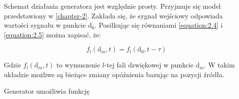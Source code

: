 Schemat działania generatora jest względnie prosty. Przyjmuje się model przedstawiony w \ref{chapter-2}. Zakłada się, że sygnał wejściowy odpowiada wartości sygnału w punkcie $\bm{\mathrm{d}}_{0}$. Posiłkując się równaniami \ref{equation:2.4} i \ref{equation:2.5} można zapisać, że:

\begin{equation}
    \label{delay model}
    f_{l}(\bm{\mathrm{d}}_{m},t) = 
    f_{l}(\bm{\mathrm{d}}_{0},t-\tau)
\end{equation}

\noindent Gdzie $f_{l}(\bm{\mathrm{d}}_{m},t)$ to wymuszenie $l$-tej fali dzwiękowej w punkcie $\bm{\mathrm{d}}_{m}$. W takim układzie możliwe są bieżące zmiany opóźnienia bazując na pozycji źródła.

\noindent Generator umożliwia funkcję 
